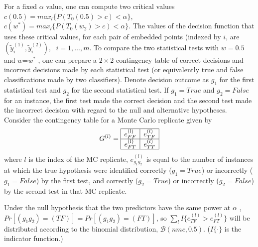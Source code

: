 \documentclass[12pt,oneside,final]{thesis}\usepackage[]{graphicx}\usepackage[]{color}
\begin{document}
For a fixed $\alpha$ value, one can compute two critical values $c(0.5)=max_l \{  P(T_0(0.5)>c)<\alpha\}$,  $c(w^*)=max_l \{  P(T_0(w_2)>c)<\alpha\}$. The values of the decision function that uses these critical  values, for each pair of embedded points (indexed by $i$, are  $(\tilde{y}_i^{(1)},\tilde{y}_i^{(2)}),\hspace{7pt}i=1,\ldots,m$. To compare the  two statistical tests with  $w=0.5$ and $w$=$w^*$  , one can prepare a $2\times 2$ contingency-table of correct decisions and incorrect decisions made by each statistical test (or equivalently true and false classifications made by two classifiers). Denote decision outcome as $g_1$ for the first statistical test and $g_2$ for the second statistical test. If $g_1=True$ and $g_2=False$ for an instance,  the first test made the correct decision and the second test made the incorrect decision with regard to the null and alternative hypotheses.
Consider the contingency table for a Monte Carlo replicate given by $$G^{(l)}= \begin{array}{|c|c|}
      \hline
       e_{FF}^{(l)} & e_{TF}^{(l)}\\
      \hline
       e_{FT}^{(l)} & e_{TT}^{(l)}\\
      \hline
      \end{array}      $$  where $l$ is the index of the MC replicate, $e_{g_1g_2}^{(l)}$ is equal to the number of instances at which the true hypothesis were identified  correctly ($g_1=True$) or incorrectly ($g_1=False$) by the first test, and correctly ($g_2=True$) or incorrectly ($g_2=False$) by the second test in that MC replicate.

Under the null  hypothesis that the two predictors have the same power at $\alpha$ ,
 $Pr[\left(g_1g_2\right)=(TF)]=Pr[\left(g_1g_2\right)=(FT)]$, so $\sum_l{I \{e_{TF}^{(l)}>e_{FT}^{(l)}\}}$ will be distributed according to  the binomial distribution, $\mathcal{B}(nmc,0.5)$. ($I\{\cdot\}$ is the indicator function.) 

\end{document}

